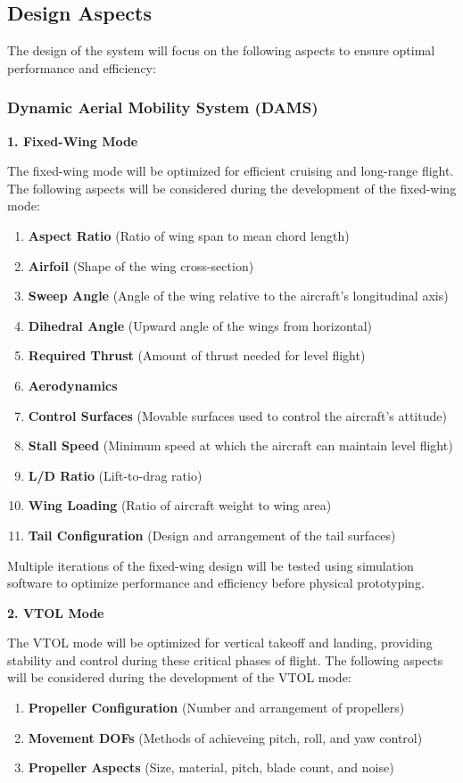 \documentclass[12pt]{article}
\begin{document}
\subsection{Design Aspects}
The design of the system will focus on the following aspects to ensure optimal performance and efficiency:
\subsubsection{Dynamic Aerial Mobility System (DAMS)}
\textbf{1. Fixed-Wing Mode}

The fixed-wing mode will be optimized for efficient cruising and long-range flight.
The following aspects will be considered during the development of the fixed-wing mode:
\begin{enumerate}
    \item \textbf{Aspect Ratio} (Ratio of wing span to mean chord length)
    \item \textbf{Airfoil} (Shape of the wing cross-section)
    \item \textbf{Sweep Angle} (Angle of the wing relative to the aircraft's longitudinal axis)
    \item \textbf{Dihedral Angle} (Upward angle of the wings from horizontal)
    \item \textbf{Required Thrust} (Amount of thrust needed for level flight)
    \item \textbf{Aerodynamics}
    \item \textbf{Control Surfaces} (Movable surfaces used to control the aircraft's attitude)
    \item \textbf{Stall Speed} (Minimum speed at which the aircraft can maintain level flight)
    \item \textbf{L/D Ratio} (Lift-to-drag ratio)
    \item \textbf{Wing Loading} (Ratio of aircraft weight to wing area)
    \item \textbf{Tail Configuration} (Design and arrangement of the tail surfaces)
\end{enumerate}

Multiple iterations of the fixed-wing design will be tested using simulation software to optimize performance and efficiency before physical prototyping.

\textbf{2. VTOL Mode}

The VTOL mode will be optimized for vertical takeoff and landing, providing stability and control during these critical phases of flight.
The following aspects will be considered during the development of the VTOL mode:
\begin{enumerate}
    \item \textbf{Propeller Configuration} (Number and arrangement of propellers)
    \item \textbf{Movement DOFs} (Methods of achieveing pitch, roll, and yaw control)
    \item \textbf{Propeller Aspects} (Size, material, pitch, blade count, and noise)
\end{enumerate}
\end{document}
